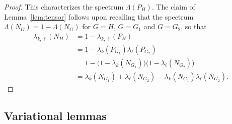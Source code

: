 \documentclass{article}
\newcommand{\1}{\mathbf{1}}
\theoremstyle{alden}
\theoremstyle{aldenthm}
\theoremstyle{definition}
\theoremstyle{remark}
\begin{document}
\begin{proof}
	This characterizes the spectrum $\Lambda(P_H)$. The claim of Lemma~\ref{lem:tensor} follows upon recalling that the spectrum $\Lambda(N_G) = 1 - \Lambda(N_G)$ for $G = H$, $G = G_1$ and $G = G_2$, so that
	\begin{align*}
	\lambda_{k,\ell}(N_H) & = 1 - \lambda_{k,\ell}(P_H) \\
	& = 1 - \lambda_{k}(P_{G_1}) \lambda_{\ell}(P_{G_2}) \\
	& = 1 - \bigl(1 - \lambda_{k}(N_{G_1})\bigr) \bigl(1 - \lambda_{\ell}(N_{G_2})\bigr) \\
	& = \lambda_{k}(N_{G_1}) + \lambda_{\ell}(N_{G_2}) - \lambda_{k}(N_{G_1}) \lambda_{\ell}(N_{G_2}).
	\end{align*}
\end{proof}


\subsection{Variational lemmas}
\end{document}
